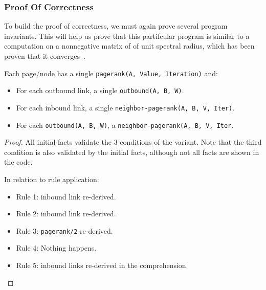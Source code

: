 \subsubsection{Proof Of Correctness}

To build the proof of correctness, we must again prove several program
invariants. This will help us prove that this partifcular program is similar to
a computation on a nonnegative matrix of of unit spectral radius, which has been
proven that it converges~\cite{DBLP:journals/corr/abs-cs-0606047,
Lubachevsky:1986:CAA:4904.4801}.

\begin{invariant}
Each page/node has a single \texttt{pagerank(A, Value, Iteration)} and:
\begin{itemize}
   \item For each outbound link, a single \texttt{\bang outbound(A, B, W)}.
   \item For each inbound link, a single \texttt{neighbor-pagerank(A, B, V, Iter)}.
   \item For each \texttt{\bang outbound(A, B, W)}, a \texttt{neighbor-pagerank(A,
      B, V, Iter}.
\end{itemize}
\end{invariant}

\begin{proof}

All initial facts validate the 3 conditions of the variant. Note that the third
condition is also validated by the initial facts, although not all facts are shown in
the code.

In relation to rule application:

\begin{itemize}
   \item Rule 1: inbound link re-derived.
   \item Rule 2: inbound link re-derived.
   \item Rule 3: \texttt{pagerank/2} re-derived.
   \item Rule 4: Nothing happens.
   \item Rule 5: inbound links re-derived in the comprehension.
\end{itemize}
\end{proof}

